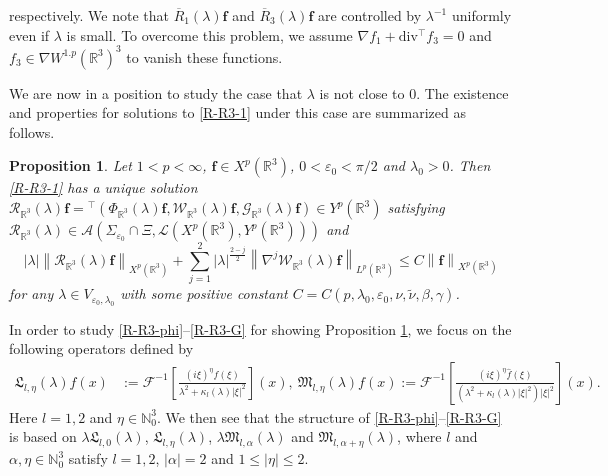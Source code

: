 \documentclass[dvipdfmx,12pt]{article}
\newtheorem{prop}[dfn]{Proposition}
\begin{document}
respectively. We note that $\overline{R}_1(\lambda)\mathbf{f}$ and $\overline{R}_3(\lambda)\mathbf{f}$ are controlled by $\lambda^{-1}$ uniformly even if $\lambda$ is small. To overcome this problem, we assume  $\nabla f_1+\mathrm{div}{}^\top f_3=0$ and $f_3\in \nabla W^{1.p}(\mathbb{R}^3)^3$ to vanish these functions.


We are now in a position to study the case that $\lambda$ is not close to $0$. The existence and properties for solutions to \eqref{R-R3-1} under this case are summarized as follows.
\begin{prop}\label{R-R3-prop1}
Let $1<p<\infty$, $\mathbf{f}\in X^p(\mathbb{R}^3)$, $0<\varepsilon_0<\pi/2$ and $\lambda_0>0$. Then \eqref{R-R3-1} has a unique solution $\mathcal{R}_{\mathbb{R}^3}(\lambda)\mathbf{f}={}^\top(\Phi_{\mathbb{R}^3}(\lambda)\mathbf{f},\mathcal{W}_{\mathbb{R}^3}(\lambda)\mathbf{f},\mathcal{G}_{\mathbb{R}^3}(\lambda)\mathbf{f})\in Y^p(\mathbb{R}^3)$ satisfying $\mathcal{R}_{\mathbb{R}^3}(\lambda)\in \mathcal{A}(\Sigma_{\varepsilon_0}\cap \Xi,\mathcal{L}(X^p(\mathbb{R}^3),Y^p(\mathbb{R}^3)) )$ and
\begin{equation}\label{ineq1-R-R3-prop1}
|\lambda|\left\|\mathcal{R}_{\mathbb{R}^3}(\lambda)\mathbf{f}\right\|_{X^{p}(\mathbb{R}^3)}+\sum_{j=1}^2|\lambda|^{\frac{2-j}{2}}\left\|\nabla ^j\mathcal{W}_{\mathbb{R}^3}(\lambda)\mathbf{f}\right\|_{L^{p}(\mathbb{R}^3)}\leq C\left\|\mathbf{f}\right\|_{X^{p}(\mathbb{R}^3)}
\end{equation}
for any $\lambda\in V_{\varepsilon_0,\lambda_0}$ with some positive constant $C=C(p,\lambda_0,\varepsilon_0,\nu,\tilde{\nu},\beta,\gamma)$.
\end{prop}
In order to study \eqref{R-R3-phi}--\eqref{R-R3-G} for showing Proposition \ref{R-R3-prop1}, we focus on the following operators defined by 
\begin{align}
\mathfrak{L}_{l,\eta}(\lambda)f(x)&:=\mathcal{F}^{-1}\left[\frac{(i\xi)^\eta \widehat{f}(\xi)}{\lambda^2+\kappa_l(\lambda)|\xi|^2}\right](x),~
\mathfrak{M}_{l,\eta}(\lambda)f(x):=\mathcal{F}^{-1}\left[\frac{(i\xi)^\eta\widehat{f}(\xi)}{(\lambda^2+\kappa_l(\lambda)|\xi|^2)|\xi|^2}\right](x).
\label{pr-R-R3-prop1-2}
\end{align} 
Here $l=1,2$ and $\eta\in \mathbb{N}_0^3$. We then see that the structure of \eqref{R-R3-phi}--\eqref{R-R3-G} is based on $\lambda\mathfrak{L}_{l,0}(\lambda)$, $\mathfrak{L}_{l,\eta}(\lambda)$, $\lambda\mathfrak{M}_{l,\alpha }(\lambda)$ and $\mathfrak{M}_{l,\alpha+\eta}(\lambda)$, where $l$ and $\alpha,\eta\in\mathbb{N}_0^3$ satisfy $l=1,2$, $|\alpha|=2$ and $1\le|\eta|\le 2$.
\end{document}
